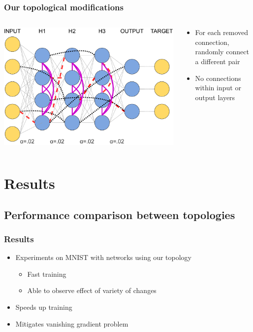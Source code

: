 \documentclass[pdf]{beamer}
\begin{document}
\begin{frame}
	\frametitle{Our topological modifications}
	\begin{columns}
		\begin{column}{.6\textwidth}
			\includegraphics[width=\textwidth]{figures/topology_changes_step4.pdf}
		\end{column}
		\begin{column}{.4\textwidth}
			\begin{itemize}
			\item For each removed connection, randomly connect a different pair
			\item No connections within input or output layers
			\end{itemize}
		\end{column}
	\end{columns}
\end{frame}

\section{Results}
\subsection{Performance comparison between topologies}
\begin{frame}
\frametitle{Results}
\begin{itemize}
	\item<1-> Experiments on MNIST with networks using our topology
	\begin{itemize}
		\item<2-> Fast training
		\item<3-> Able to observe effect of variety of changes
	\end{itemize}
	\item<4-> Speeds up training
	\item<5-> Mitigates vanishing gradient problem
\end{itemize}

\end{frame}
\end{document}
